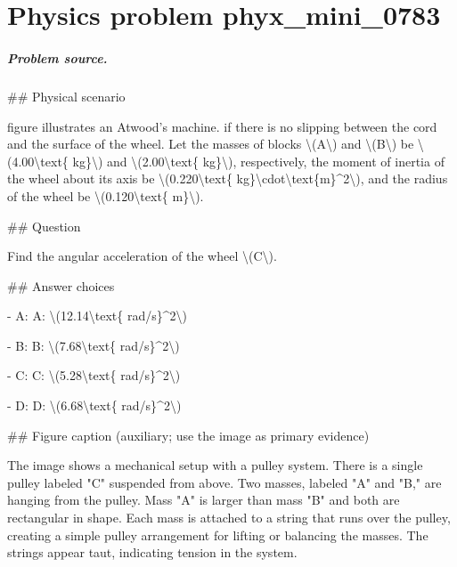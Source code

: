 
\chapter{Physics problem phyx\_mini\_0783}
\label{ch:PhyXMiniProblems_problem_phyx_mini_0783}

\paragraph{Problem source.}
\#\# Physical scenario

figure illustrates an Atwood's machine. if there is no slipping between the cord and the surface of the wheel. Let the masses of blocks \textbackslash{}(A\textbackslash{}) and \textbackslash{}(B\textbackslash{}) be \textbackslash{}(4.00\textbackslash{}text\{ kg\}\textbackslash{}) and \textbackslash{}(2.00\textbackslash{}text\{ kg\}\textbackslash{}), respectively, the moment of inertia of the wheel about its axis be \textbackslash{}(0.220\textbackslash{}text\{ kg\}\textbackslash{}cdot\textbackslash{}text\{m\}\textasciicircum{}2\textbackslash{}), and the radius of the wheel be \textbackslash{}(0.120\textbackslash{}text\{ m\}\textbackslash{}).

\#\# Question

Find the angular acceleration of the wheel \textbackslash{}(C\textbackslash{}).

\#\# Answer choices

- A: A: \textbackslash{}(12.14\textbackslash{}text\{ rad/s\}\textasciicircum{}2\textbackslash{})

- B: B: \textbackslash{}(7.68\textbackslash{}text\{ rad/s\}\textasciicircum{}2\textbackslash{})

- C: C: \textbackslash{}(5.28\textbackslash{}text\{ rad/s\}\textasciicircum{}2\textbackslash{})

- D: D: \textbackslash{}(6.68\textbackslash{}text\{ rad/s\}\textasciicircum{}2\textbackslash{})

\#\# Figure caption (auxiliary; use the image as primary evidence)

The image shows a mechanical setup with a pulley system. There is a single pulley labeled "C" suspended from above. Two masses, labeled "A" and "B," are hanging from the pulley. Mass "A" is larger than mass "B" and both are rectangular in shape. Each mass is attached to a string that runs over the pulley, creating a simple pulley arrangement for lifting or balancing the masses. The strings appear taut, indicating tension in the system.

